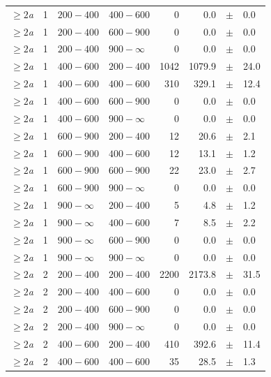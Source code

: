 \begin{table}[!h]
\begin{tabular}{rrllrrcl}
$\geq 2${\it a} & 1 & $ 200- 400$ & $400-600$ &      0 &      0.0 &$\pm$&    0.0 \\
$\geq 2${\it a} & 1 & $ 200- 400$ & $600-900$ &      0 &      0.0 &$\pm$&    0.0 \\
$\geq 2${\it a} & 1 & $ 200- 400$ & $900-\infty$ &      0 &      0.0 &$\pm$&    0.0 \\
$\geq 2${\it a} & 1 & $ 400- 600$ & $200-400$ &   1042 &   1079.9 &$\pm$&   24.0 \\
$\geq 2${\it a} & 1 & $ 400- 600$ & $400-600$ &    310 &    329.1 &$\pm$&   12.4 \\
$\geq 2${\it a} & 1 & $ 400- 600$ & $600-900$ &      0 &      0.0 &$\pm$&    0.0 \\
$\geq 2${\it a} & 1 & $ 400- 600$ & $900-\infty$ &      0 &      0.0 &$\pm$&    0.0 \\
$\geq 2${\it a} & 1 & $ 600- 900$ & $200-400$ &     12 &     20.6 &$\pm$&    2.1 \\
$\geq 2${\it a} & 1 & $ 600- 900$ & $400-600$ &     12 &     13.1 &$\pm$&    1.2 \\
$\geq 2${\it a} & 1 & $ 600- 900$ & $600-900$ &     22 &     23.0 &$\pm$&    2.7 \\
$\geq 2${\it a} & 1 & $ 600- 900$ & $900-\infty$ &      0 &      0.0 &$\pm$&    0.0 \\
$\geq 2${\it a} & 1 & $ 900- \infty$ & $200-400$ &      5 &      4.8 &$\pm$&    1.2 \\
$\geq 2${\it a} & 1 & $ 900- \infty$ & $400-600$ &      7 &      8.5 &$\pm$&    2.2 \\
$\geq 2${\it a} & 1 & $ 900- \infty$ & $600-900$ &      0 &      0.0 &$\pm$&    0.0 \\
$\geq 2${\it a} & 1 & $ 900- \infty$ & $900-\infty$ &      0 &      0.0 &$\pm$&    0.0 \\
$\geq 2${\it a} & 2 & $ 200- 400$ & $200-400$ &   2200 &   2173.8 &$\pm$&   31.5 \\
$\geq 2${\it a} & 2 & $ 200- 400$ & $400-600$ &      0 &      0.0 &$\pm$&    0.0 \\
$\geq 2${\it a} & 2 & $ 200- 400$ & $600-900$ &      0 &      0.0 &$\pm$&    0.0 \\
$\geq 2${\it a} & 2 & $ 200- 400$ & $900-\infty$ &      0 &      0.0 &$\pm$&    0.0 \\
$\geq 2${\it a} & 2 & $ 400- 600$ & $200-400$ &    410 &    392.6 &$\pm$&   11.4 \\
$\geq 2${\it a} & 2 & $ 400- 600$ & $400-600$ &     35 &     28.5 &$\pm$&    1.3 \\

\end{tabular}
\end{table}
